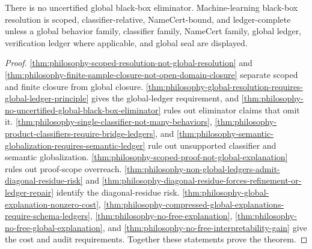 \begin{theorem}
\label{thm:philosophy-no-global-black-box-eliminator-theorem}
There is no uncertified global black-box eliminator. Machine-learning
black-box resolution is scoped, classifier-relative, NameCert-bound, and
ledger-complete unless a global behavior family, classifier family,
NameCert family, global ledger, verification ledger where applicable,
and global seal are displayed.
\end{theorem}
\begin{proof}
\autoref{thm:philosophy-scoped-resolution-not-global-resolution} and
\autoref{thm:philosophy-finite-sample-closure-not-open-domain-closure}
separate scoped and finite closure from global closure.
\autoref{thm:philosophy-global-resolution-requires-global-ledger-principle}
gives the global-ledger requirement, and
\autoref{thm:philosophy-no-uncertified-global-black-box-eliminator}
rules out eliminator claims that omit it.
\autoref{thm:philosophy-single-classifier-not-many-behaviors},
\autoref{thm:philosophy-product-classifiers-require-bridge-ledgers},
and
\autoref{thm:philosophy-semantic-globalization-requires-semantic-ledger}
rule out unsupported classifier and semantic globalization.
\autoref{thm:philosophy-scoped-proof-not-global-explanation}
rules out proof-scope overreach.
\autoref{thm:philosophy-non-global-ledgers-admit-diagonal-residue-risk}
and
\autoref{thm:philosophy-diagonal-residue-forces-refinement-or-ledger-repair}
identify the diagonal-residue risk.
\autoref{thm:philosophy-global-explanation-nonzero-cost},
\autoref{thm:philosophy-compressed-global-explanations-require-schema-ledgers},
\autoref{thm:philosophy-no-free-explanation},
\autoref{thm:philosophy-no-free-global-explanation}, and
\autoref{thm:philosophy-no-free-interpretability-gain}
give the cost and audit requirements. Together these statements prove
the theorem.
\end{proof}
